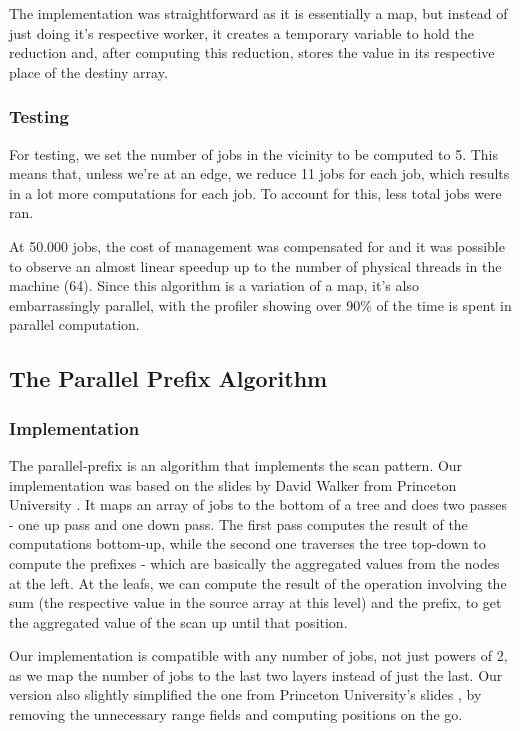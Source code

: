 \documentclass[10pt,journal]{IEEEtran}
\begin{document}
The implementation was straightforward as it is essentially a map, but instead of just doing it's respective worker, it creates a temporary variable to hold the reduction and, after computing this reduction, stores the value in its respective place of the destiny array.

\subsubsection{Testing}

For testing, we set the number of jobs in the vicinity to be computed to 5. This means that, unless we're at an edge, we reduce 11 jobs for each job, which results in a lot more computations for each job. To account for this, less total jobs were ran. 

At 50.000 jobs, the cost of management was compensated for and it was possible to observe an almost linear speedup up to the number of physical threads in the machine (64). Since this algorithm is a variation of a map, it's also embarrassingly parallel, with the profiler showing over 90\% of the time is spent in parallel computation.

\subsection{The Parallel Prefix Algorithm}

\subsubsection{Implementation}

The parallel-prefix is an algorithm that implements the scan pattern. Our implementation was based on the slides by David Walker from Princeton University \cite{parprefix}. It maps an array of jobs to the bottom of a tree and does two passes - one up pass and one down pass. The first pass computes the result of the computations bottom-up, while the second one traverses the tree top-down to compute the prefixes - which are basically the aggregated values from the nodes at the left. At the leafs, we can compute the result of the operation involving the sum (the respective value in the source array at this level) and the prefix, to get the aggregated value of the scan up until that position.

Our implementation is compatible with any number of jobs, not just powers of 2, as we map the number of jobs to the last two layers instead of just the last. Our version also slightly simplified the one from Princeton University's slides \cite{parprefix}, by removing the unnecessary range fields and computing positions on the go.
\end{document}
